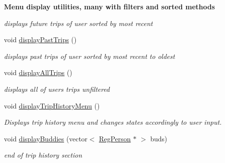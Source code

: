 \begin{Indent}{\bf Menu display utilities, many with filters and sorted methods}
\begin{DoxyCompactItemize}
\begin{DoxyCompactList}\small\item\em displays future trips of user sorted by most recent \end{DoxyCompactList}\item 
\hypertarget{class_lyfter_a781109b2b8a2d3a1b8b0525e370bf6e5}{void \hyperlink{class_lyfter_a781109b2b8a2d3a1b8b0525e370bf6e5}{display\+Past\+Trips} ()}\label{class_lyfter_a781109b2b8a2d3a1b8b0525e370bf6e5}

\begin{DoxyCompactList}\small\item\em displays past trips of user sorted by most recent to oldest \end{DoxyCompactList}\item 
\hypertarget{class_lyfter_a73267daf6170342010d49f047ae15990}{void \hyperlink{class_lyfter_a73267daf6170342010d49f047ae15990}{display\+All\+Trips} ()}\label{class_lyfter_a73267daf6170342010d49f047ae15990}

\begin{DoxyCompactList}\small\item\em displays all of users trips unfiltered \end{DoxyCompactList}\item 
\hypertarget{class_lyfter_ae8b47c657a5c6eb935cc0c32d951619a}{void \hyperlink{class_lyfter_ae8b47c657a5c6eb935cc0c32d951619a}{display\+Trip\+History\+Menu} ()}\label{class_lyfter_ae8b47c657a5c6eb935cc0c32d951619a}

\begin{DoxyCompactList}\small\item\em Displays trip history menu and changes states accordingly to user input. \end{DoxyCompactList}\item 
void \hyperlink{class_lyfter_a4d746413f6c4d5ea96e6ba39c75ec64a}{display\+Buddies} (vector$<$ \hyperlink{class_reg_person}{Reg\+Person} $\ast$ $>$ buds)
\begin{DoxyCompactList}\small\item\em end of trip history section \end{DoxyCompactList}\end{DoxyCompactItemize}
\end{Indent}
